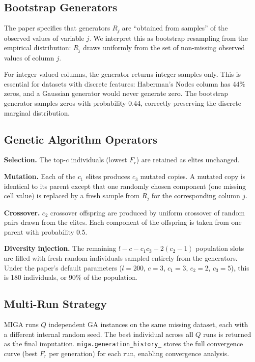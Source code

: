 \subsection{Bootstrap Generators}
\label{sec:generators}

The paper specifies that generators $R_j$ are ``obtained from samples'' of the observed values of variable $j$. We interpret this as bootstrap resampling from the empirical distribution: $R_j$ draws uniformly from the set of non-missing observed values of column $j$.

For integer-valued columns, the generator returns integer samples only. This is essential for datasets with discrete features: Haberman's Nodes column has 44\% zeros, and a Gaussian generator would never generate zero. The bootstrap generator samples zeros with probability 0.44, correctly preserving the discrete marginal distribution.

\subsection{Genetic Algorithm Operators}

\textbf{Selection.} The top-$c$ individuals (lowest $F_r$) are retained as elites unchanged.

\textbf{Mutation.} Each of the $c_1$ elites produces $c_3$ mutated copies. A mutated copy is identical to its parent except that one randomly chosen component (one missing cell value) is replaced by a fresh sample from $R_j$ for the corresponding column $j$.

\textbf{Crossover.} $c_2$ crossover offspring are produced by uniform crossover of random pairs drawn from the elites. Each component of the offspring is taken from one parent with probability 0.5.

\textbf{Diversity injection.} The remaining $l - c - c_1 c_3 - 2(c_2 - 1)$ population slots are filled with fresh random individuals sampled entirely from the generators. Under the paper's default parameters ($l=200$, $c=3$, $c_1=3$, $c_2=2$, $c_3=5$), this is 180 individuals, or 90\% of the population.

\subsection{Multi-Run Strategy}

MIGA runs $Q$ independent GA instances on the same missing dataset, each with a different internal random seed. The best individual across all $Q$ runs is returned as the final imputation. \texttt{miga.generation\_history\_} stores the full convergence curve (best $F_r$ per generation) for each run, enabling convergence analysis.

